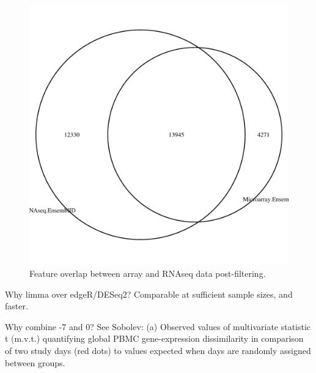 \subsection{}

\begin{figure}
    \includegraphics[width=1.0\textwidth]{./mainmatter/figures/chapter_02/array_data_setup.rnaseqFeatureOverlap.Ensembl.postFiltering.pdf}
    \caption{Feature overlap between array and RNAseq data post-filtering.}
\end{figure}

Why limma over edgeR/DESeq2?
Comparable at sufficient sample sizes, and faster.

Why combine -7 and 0?
See Sobolev: (a) Observed values of multivariate statistic t (m.v.t.) quantifying global PBMC gene-expression dissimilarity in comparison of two study days (red dots) to values expected when days are randomly assigned between groups.

